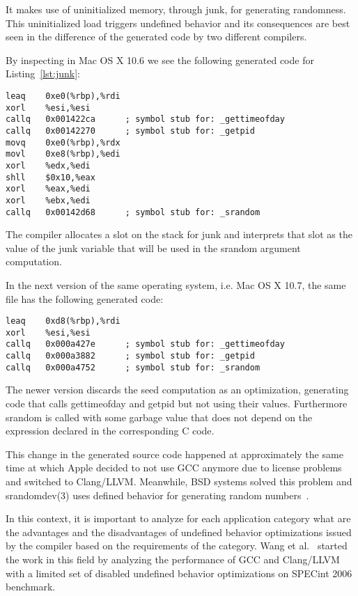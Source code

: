 It makes use of uninitialized memory, through junk, for generating
randomness. This uninitialized load triggers undefined behavior  and its
consequences are best seen in the difference of the generated code by
two different compilers.

By inspecting  in Mac OS X 10.6 we see
the following generated code for Listing~\ref{lst:junk}:
\begin{lstlisting}[style=Cstyle, caption={}, label={}]
leaq    0xe0(%rbp),%rdi
xorl    %esi,%esi
callq   0x001422ca      ; symbol stub for: _gettimeofday
callq   0x00142270      ; symbol stub for: _getpid
movq    0xe0(%rbp),%rdx
movl    0xe8(%rbp),%edi
xorl    %edx,%edi
shll    $0x10,%eax
xorl    %eax,%edi
xorl    %ebx,%edi
callq   0x00142d68      ; symbol stub for: _srandom
\end{lstlisting}

The compiler allocates a slot on the stack for junk and interprets that
slot as the value of the junk variable that will be used in the srandom
argument computation. 

In the next version of the same operating system, i.e. Mac OS X 10.7,
the same file has the following generated code:
\begin{lstlisting}[style=Cstyle, caption={}, label={}]
leaq    0xd8(%rbp),%rdi
xorl    %esi,%esi
callq   0x000a427e      ; symbol stub for: _gettimeofday
callq   0x000a3882      ; symbol stub for: _getpid
callq   0x000a4752      ; symbol stub for: _srandom
\end{lstlisting}

The newer version discards the seed computation as an optimization,
generating code that calls gettimeofday and getpid but not using their
values. Furthermore srandom is called with some garbage value that does
not depend on the expression declared in the corresponding C code.

This change in the generated source code happened at approximately the
same time at which Apple decided to not use GCC anymore due to license
problems and switched to Clang/LLVM. Meanwhile, BSD systems solved this
problem and srandomdev(3) uses defined behavior for generating random
numbers~\cite{junkobsd,junkfbsd,junkdbsd}.

In this context, it is important to analyze for each application
category what are the advantages and the disadvantages of undefined
behavior optimizations issued by the compiler based on the requirements
of the category. Wang et al.~\cite{wang2012undefined} started the work
in this field by analyzing the performance of GCC and Clang/LLVM with a
limited set of disabled undefined behavior optimizations on SPECint 2006
benchmark.

